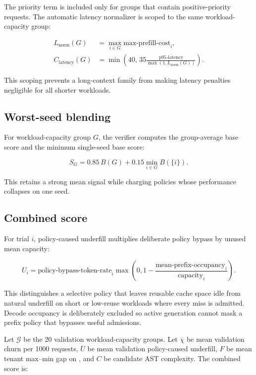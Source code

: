 \documentclass[11pt]{article}
\newcommand{\code}[1]{\texttt{\detokenize{#1}}}
\begin{document}
The priority term is included only for groups that contain positive-priority requests.
The automatic latency normalizer is scoped to the same workload-capacity group:

\begin{align}
  L_{\text{norm}}(G) &=
  \max_{i\in G}\text{max-prefill-cost}_i,\\
  C_{\text{latency}}(G) &=
  \min\left(40,\,
    35\frac{\overline{\text{p95-latency}}}{\max(1,L_{\text{norm}}(G))}
  \right).
\end{align}

This scoping prevents a long-context family from making latency penalties negligible
for all shorter workloads.

\subsection{Worst-seed blending}

For workload-capacity group \(G\), the verifier computes the group-average base score
and the minimum single-seed base score:

\begin{equation}
  S_G = 0.85\,B(G) + 0.15\min_{i\in G}B(\{i\}).
\end{equation}

This retains a strong mean signal while charging policies whose performance collapses
on one seed.

\subsection{Combined score}

For trial \(i\), policy-caused underfill multiplies deliberate policy bypass by unused
mean capacity:

\begin{equation}
  U_i =
  \text{policy-bypass-token-rate}_i
  \max\left(0,1-\frac{\text{mean-prefix-occupancy}_i}{\text{capacity}_i}\right).
\end{equation}

This distinguishes a selective policy that leaves reusable cache space idle from
natural underfill on short or low-reuse workloads where every miss is admitted.  Decode
occupancy is deliberately excluded so active generation cannot mask a prefix policy
that bypasses useful admissions.

Let \(\mathcal{G}\) be the 20 validation workload-capacity groups.  Let
\(\overline{\chi}\) be mean validation churn per 1000 requests, \(\overline{U}\) be
mean validation policy-caused underfill, \(F\) be mean tenant max--min gap on
\code{multi_tenant_skew}, and \(C\) be candidate AST complexity.  The combined score
is:
\end{document}
